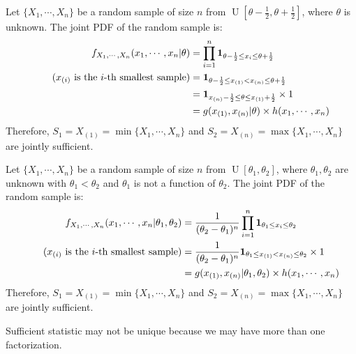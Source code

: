 \documentclass{huhtakm-template-book-v2}
\DeclareMathOperator{\U}{U}
\begin{document}
\begin{eg}
	Let $\{X_{1},\cdots,X_{n}\}$ be a random sample of size $n$ from $\U[\theta-\frac{1}{2},\theta+\frac{1}{2}]$, where $\theta$ is unknown. The joint PDF of the random sample is:
	\begin{align*}
		f_{X_{1},\cdots,X_{n}}(x_{1},\cdots,x_{n}|\theta)&=\prod_{i=1}^{n}\mathbf{1}_{\theta-\frac{1}{2}\leq x_{i}\leq\theta+\frac{1}{2}}\\
		\tag{$x_{(i)}$ is the $i$-th smallest sample}
		&=\mathbf{1}_{\theta-\frac{1}{2}\leq x_{(1)}<x_{(n)}\leq\theta+\frac{1}{2}}\\
		&=\mathbf{1}_{x_{(n)}-\frac{1}{2}\leq\theta\leq x_{(1)}+\frac{1}{2}}\times 1\\
		&=g(x_{(1)},x_{(n)}|\theta)\times h(x_{1},\cdots,x_{n})
	\end{align*}
	Therefore, $S_{1}=X_{(1)}=\min\{X_{1},\cdots,X_{n}\}$ and $S_{2}=X_{(n)}=\max\{X_{1},\cdots,X_{n}\}$ are jointly sufficient.
\end{eg}
\begin{eg}
	Let $\{X_{1},\cdots,X_{n}\}$ be a random sample of size $n$ from $\U[\theta_{1},\theta_{2}]$, where $\theta_{1},\theta_{2}$ are unknown with $\theta_{1}<\theta_{2}$ and $\theta_{1}$ is not a function of $\theta_{2}$. The joint PDF of the random sample is:
	\begin{align*}
		f_{X_{1},\cdots,X_{n}}(x_{1},\cdots,x_{n}|\theta_{1},\theta_{2})&=\frac{1}{(\theta_{2}-\theta_{1})^{n}}\prod_{i=1}^{n}\mathbf{1}_{\theta_{1}\leq x_{i}\leq\theta_{2}}\\
		\tag{$x_{(i)}$ is the $i$-th smallest sample}
		&=\frac{1}{(\theta_{2}-\theta_{1})^{n}}\mathbf{1}_{\theta_{1}\leq x_{(1)}<x_{(n)}\leq\theta_{2}}\times 1\\
		&=g(x_{(1)},x_{(n)}|\theta_{1},\theta_{2})\times h(x_{1},\cdots,x_{n})
	\end{align*}
	Therefore, $S_{1}=X_{(1)}=\min\{X_{1},\cdots,X_{n}\}$ and $S_{2}=X_{(n)}=\max\{X_{1},\cdots,X_{n}\}$ are jointly sufficient.
\end{eg}
\begin{rem}
	Sufficient statistic may not be unique because we may have more than one factorization.
\end{rem}
\end{document}

